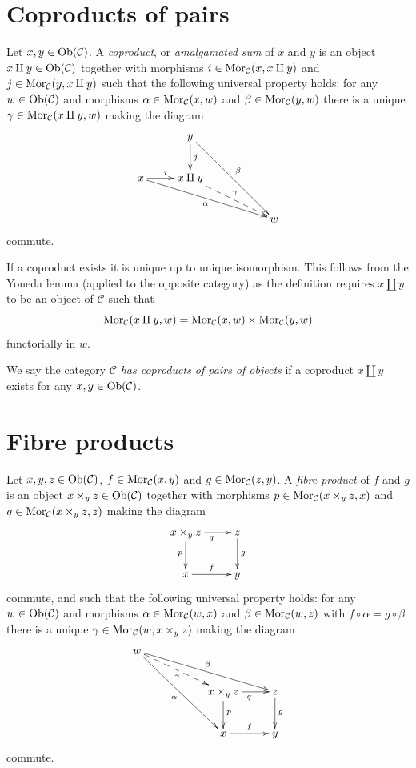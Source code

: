 \section{Coproducts of pairs}
\label{section-coproducts-pairs}

\begin{definition}
\label{definition-coproducts}
Let $x, y \in \mathop{\mathrm{Ob}}\nolimits(\mathcal{C})$.
A {\it coproduct}, or {\it amalgamated sum}
of $x$ and $y$ is
an object $x \amalg y \in \mathop{\mathrm{Ob}}\nolimits(\mathcal{C})$
together with morphisms
$i \in \mathop{\mathrm{Mor}}\nolimits_{\mathcal C}(x, x \amalg y)$ and
$j \in \mathop{\mathrm{Mor}}\nolimits_{\mathcal C}(y, x \amalg y)$ such
that the following universal property holds:
for
any $w \in \mathop{\mathrm{Ob}}\nolimits(\mathcal{C})$ and morphisms
$\alpha \in \mathop{\mathrm{Mor}}\nolimits_{\mathcal C}(x, w)$ and
$\beta \in \mathop{\mathrm{Mor}}\nolimits_\mathcal{C}(y, w)$
there is a unique
$\gamma \in \mathop{\mathrm{Mor}}\nolimits_{\mathcal C}(x \amalg y, w)$
making
the diagram
$$
\xymatrix{
& y \ar[d]^j \ar[rrdd]^\beta \\
x \ar[r]^i \ar[rrrd]_\alpha & x \amalg y
\ar@{-->}[rrd]^\gamma \\
& & & w
}
$$
commute.
\end{definition}

\noindent
If a coproduct exists it is unique up to
unique
isomorphism. This follows from the Yoneda
lemma (applied to the
opposite category) as
the definition requires $x \amalg y$ to be an
object
of $\mathcal{C}$ such that
$$
\mathop{\mathrm{Mor}}\nolimits_\mathcal{C}(x \amalg y, w) =
\mathop{\mathrm{Mor}}\nolimits_\mathcal{C}(x, w) \times
\mathop{\mathrm{Mor}}\nolimits_\mathcal{C}(y, w)
$$
functorially in $w$.

\begin{definition}
\label{definition-has-coproducts-of-pairs}
We say the category $\mathcal{C}$ {\it has
coproducts of pairs
of objects} if a coproduct $x \amalg y$
exists for any $x, y \in \mathop{\mathrm{Ob}}\nolimits(\mathcal{C})$.
\end{definition}
\section{Fibre products}
\label{section-fibre-products}

\begin{definition}
\label{definition-fibre-products}
Let $x, y, z\in \mathop{\mathrm{Ob}}\nolimits(\mathcal{C})$,
$f\in \mathop{\mathrm{Mor}}\nolimits_\mathcal{C}(x, y)$
and $g\in \mathop{\mathrm{Mor}}\nolimits_{\mathcal C}(z, y)$.
A {\it fibre product} of $f$ and $g$ is
an object $x \times_y z\in \mathop{\mathrm{Ob}}\nolimits(\mathcal{C})$
together with morphisms
$p \in \mathop{\mathrm{Mor}}\nolimits_{\mathcal C}(x \times_y z, x)$
and
$q \in \mathop{\mathrm{Mor}}\nolimits_{\mathcal C}(x \times_y z, z)$
making the diagram
$$
\xymatrix{
x \times_y z \ar[r]_q \ar[d]_p & z \ar[d]^g
\\
x \ar[r]^f & y
}
$$
commute, and such that the following
universal property holds: for
any $w\in \mathop{\mathrm{Ob}}\nolimits(\mathcal{C})$ and morphisms
$\alpha \in \mathop{\mathrm{Mor}}\nolimits_{\mathcal C}(w, x)$ and
$\beta \in \mathop{\mathrm{Mor}}\nolimits_\mathcal{C}(w, z)$ with
$f \circ \alpha = g \circ \beta$
there is a unique
$\gamma \in \mathop{\mathrm{Mor}}\nolimits_{\mathcal C}(w, x \times_y
z)$ making
the diagram
$$
\xymatrix{
w \ar[rrrd]^\beta \ar@{-->}[rrd]_\gamma
\ar[rrdd]_\alpha & & \\
& & x \times_y z \ar[d]^p \ar[r]_q & z
\ar[d]^g \\
& & x \ar[r]^f & y
}
$$
commute.
\end{definition}

